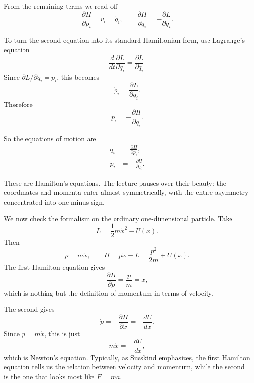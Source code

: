 From the remaining terms we read off
\begin{equation}
\frac{\partial H}{\partial p_i}=v_i=\dot q_i,
\qquad
\frac{\partial H}{\partial q_i}=-\frac{\partial L}{\partial q_i}.
\end{equation}

To turn the second equation into its standard Hamiltonian form, use Lagrange's equation
\begin{equation}
\frac{d}{dt}\frac{\partial L}{\partial \dot q_i}=\frac{\partial L}{\partial q_i}.
\end{equation}
Since \(\partial L/\partial \dot q_i=p_i\), this becomes
\begin{equation}
\dot p_i=\frac{\partial L}{\partial q_i}.
\end{equation}
Therefore
\begin{equation}
\dot p_i=-\frac{\partial H}{\partial q_i}.
\end{equation}

So the equations of motion are
\begin{align}
\dot q_i &= \frac{\partial H}{\partial p_i}, \\
\dot p_i &= -\frac{\partial H}{\partial q_i}.
\end{align}

These are Hamilton's equations. The lecture pauses over their beauty: the coordinates and momenta enter almost symmetrically, with the entire asymmetry concentrated into one minus sign.

We now check the formalism on the ordinary one-dimensional particle. Take
\begin{equation}
L=\frac12 m\dot x^2-U(x).
\end{equation}
Then
\begin{equation}
p=m\dot x,
\qquad
H=p\dot x-L=\frac{p^2}{2m}+U(x).
\end{equation}
The first Hamilton equation gives
\begin{equation}
\frac{\partial H}{\partial p}=\frac{p}{m}=\dot x,
\end{equation}
which is nothing but the definition of momentum in terms of velocity.

The second gives
\begin{equation}
\dot p=-\frac{\partial H}{\partial x}=-\frac{dU}{dx}.
\end{equation}
Since \(p=m\dot x\), this is just
\begin{equation}
m\ddot x=-\frac{dU}{dx},
\end{equation}
which is Newton's equation. Typically, as Susskind emphasizes, the first Hamilton equation tells us the relation between velocity and momentum, while the second is the one that looks most like \(F=ma\).

